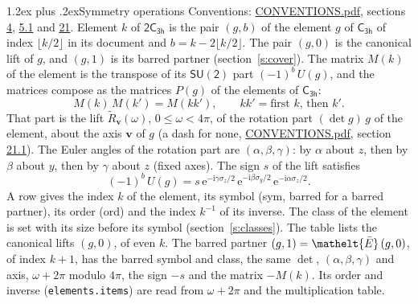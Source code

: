 \documentclass[10pt,a4paper]{article}
\makeatletter
\renewcommand\section{\@startsection{section}{1}{\z@}{-3ex plus -1ex minus -.2ex}%
  {1.2ex plus .2ex}{\normalfont\large\sffamily\bfseries\color{parttitle}}}
\numberwithin{equation}{section}
\newcommand{\eltfont}[1]{{\let\sigma\eltsigma\mathelt{#1}}}
\newcommand{\grp}[1]{\mathsf{#1}}
\newcommand{\elt}[1]{\eltfont{#1}}
\newcommand{\vv}{\mathbf{v}}
\newcommand{\iunit}{\mathrm{i}}
\newcommand{\expe}{\mathrm{e}}
\newcommand{\barred}[1]{\bar{#1}}
\newcommand{\lift}[1]{\tilde{#1}}
\newcommand{\pauli}[1]{\sigma_{#1}}
\makeatother
\begin{document}
\section{Symmetry operations}\label{s:elements}
Conventions: \href{../../CONVENTIONS.pdf}{CONVENTIONS.pdf}, sections \href{../../../rotation/CONVENTIONS.pdf\#conv.4}{4}, \href{../../../rotation/CONVENTIONS.pdf\#conv.5.1}{5.1} and \href{../../CONVENTIONS.pdf\#conv.21}{21}.
\leavevmode\label{n:index.element}\label{n:element.g}Element $k$ of $\grp{2C_{3h}}$ is the pair $(g, b)$ of the element $g$ of \href{../../../rotation/data/pdf/C3h.pdf}{$\grp{C_{3h}}$} of index $\lfloor k/2\rfloor$ in its document and $b = k - 2\lfloor k/2\rfloor$. The pair $(g, 0)$ is the canonical lift of $g$, and $(g, 1)$ is its barred partner (section~\ref{s:cover}). \label{n:matrix.element.pin}\label{n:matrix.element}The matrix $M(k)$ of the element is the transpose of its $\grp{SU(2)}$ part $(-1)^{b}\,U(g)$, and the matrices compose as the matrices $P(g)$ of the elements of $\grp{C_{3h}}$:
\begin{equation}\label{e:mprod}M(k)\,M(k') = M(kk'),\qquad kk' = \text{first } k\text{, then } k'.\end{equation}
\leavevmode\label{n:angle.omega}\label{n:vector.axis}\label{n:vector.pole}That part is the lift $\lift{R}_{\vv}(\omega)$, $0 \le \omega < 4\pi$, of the rotation part $(\det g)\,g$ of the element, about the axis $\vv$ of $g$ (a dash for none, \href{../../CONVENTIONS.pdf}{CONVENTIONS.pdf}, section \href{../../CONVENTIONS.pdf\#conv.21.1}{21.1}). \label{n:angle.euler.alpha}\label{n:angle.euler.beta}\label{n:angle.euler.gamma}\label{n:vector.coordinates}The Euler angles of the rotation part are $(\alpha,\beta,\gamma)$: by $\alpha$ about $z$, then by $\beta$ about $y$, then by $\gamma$ about $z$ (fixed axes). \label{n:local.euler.sign}The sign $s$ of the lift satisfies
\begin{equation}\label{e:euler}(-1)^{b}\,U(g) = s\,\expe^{-\iunit\gamma\pauli{z}/2}\,\expe^{-\iunit\beta\pauli{y}/2}\,\expe^{-\iunit\alpha\pauli{z}/2}.\end{equation}
\leavevmode\label{n:index.element.inverse}\label{n:head.sym}\label{n:head.ord}A row gives the index $k$ of the element, its symbol (sym, barred for a barred partner), its order (ord) and the index $k^{-1}$ of its inverse. \label{n:head.class}The class of the element is set with its size before its symbol (section~\ref{s:classes}).
The table lists the canonical lifts $(g, 0)$, of even $k$. The barred partner $(g, 1) = \elt{\barred{E}}\,(g, 0)$, of index $k + 1$, has the barred symbol and class, the same $\det$, $(\alpha,\beta,\gamma)$ and axis, $\omega + 2\pi$ modulo $4\pi$, the sign $-s$ and the matrix $-M(k)$. Its order and inverse (\texttt{elements.items}) are read from $\omega + 2\pi$ and the multiplication table.
\end{document}
